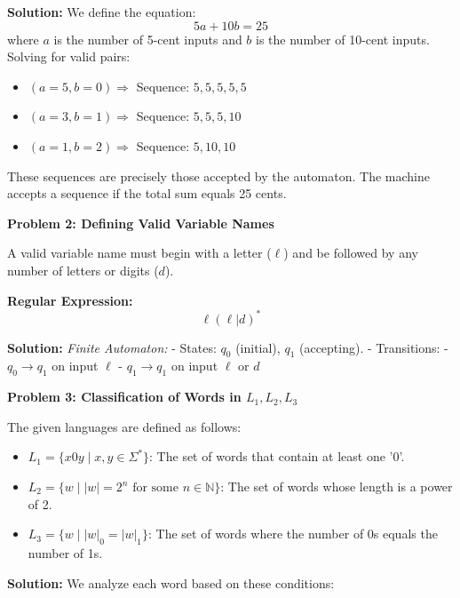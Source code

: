 \documentclass{article}
\theoremstyle{theorem}
\theoremstyle{definition}
\theoremstyle{remark}
\begin{document}
\textbf{Solution:}
We define the equation:
\begin{equation}
5a + 10b = 25
\end{equation}
where $a$ is the number of 5-cent inputs and $b$ is the number of 10-cent inputs. Solving for valid pairs:
\begin{itemize}
    \item $(a=5, b=0) \Rightarrow$ Sequence: $5,5,5,5,5$
    \item $(a=3, b=1) \Rightarrow$ Sequence: $5,5,5,10$
    \item $(a=1, b=2) \Rightarrow$ Sequence: $5,10,10$
\end{itemize}
These sequences are precisely those accepted by the automaton. The machine accepts a sequence if the total sum equals 25 cents.\newline

\textbf{Problem 2: Defining Valid Variable Names}

A valid variable name must begin with a letter ($\ell$) and be followed by any number of letters or digits ($d$).

\textbf{Regular Expression:}
\begin{equation}
\ell(\ell | d)^*
\end{equation}

\textbf{Solution:}
\textit{Finite Automaton:}
- States: $q_0$ (initial), $q_1$ (accepting).
- Transitions:
  - $q_0 \to q_1$ on input $\ell$
  - $q_1 \to q_1$ on input $\ell$ or $d$

\textbf{Problem 3: Classification of Words in $L_1, L_2, L_3$}

The given languages are defined as follows:

\begin{itemize}
    \item $L_1 = \{ x0y \mid x, y \in \Sigma^* \}$: The set of words that contain at least one '0'.
    \item $L_2 = \{ w \mid |w| = 2^n \text{ for some } n \in \mathbb{N} \}$: The set of words whose length is a power of 2.
    \item $L_3 = \{ w \mid |w|_0 = |w|_1 \}$: The set of words where the number of 0s equals the number of 1s.
\end{itemize}

\textbf{Solution:} We analyze each word based on these conditions:
\end{document}
